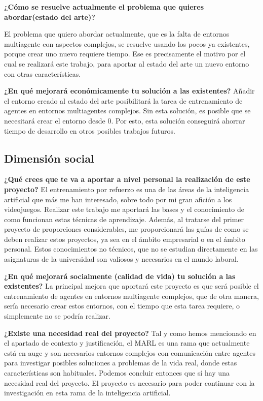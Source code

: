 \textbf{¿Cómo se resuelve actualmente el problema que quieres abordar(estado del arte)?}

El problema que quiero abordar actualmente, que es la falta de entornos multiagente con aspectos complejos, se resuelve usando los pocos ya existentes, porque crear uno nuevo requiere tiempo. Ese es precisamente el motivo por el cual se realizará este trabajo, para aportar al estado del arte un nuevo entorno con otras características.  

\textbf{¿En qué mejorará económicamente tu solución a las existentes?}
Añadir el entorno creado al estado del arte posibilitará la tarea de entrenamiento de agentes en entornos multiagentes complejos. Sin esta solución, es posible que se necesitará crear el entorno desde 0. Por esto, esta solución conseguirá ahorrar tiempo de desarrollo en otros posibles trabajos futuros. 

\subsection{Dimensión social}

\textbf{¿Qué crees que te va a aportar a nivel personal la realización de este proyecto?}
El entrenamiento por refuerzo es una de las áreas de la inteligencia artificial que más me han interesado, sobre todo por mi gran afición a los videojuegos. Realizar este trabajo me aportará las bases y el conocimiento de como funcionan estas técnicas de aprendizaje. Además, al tratarse del primer proyecto de proporciones considerables, me proporcionará las guías de como se deben realizar estos proyectos, ya sea en el ámbito empresarial o en el ámbito personal. Estos conocimientos no técnicos, que no se estudian directamente en las asignaturas de la universidad son valiosos y necesarios en el mundo laboral.  

\textbf{¿En qué mejorará socialmente (calidad de vida) tu solución a las existentes?}
La principal mejora que aportará este proyecto es que será posible el entrenamiento de agentes en entornos multiagente complejos, que de otra manera, sería necesario crear estos entornos, con el tiempo que esta tarea requiere, o simplemente no se podría realizar.  

\textbf{¿Existe una necesidad real del proyecto?}
Tal y como hemos mencionado en el apartado de contexto y justificación, el MARL es una rama que actualmente está en auge y son necesarios entornos complejos con comunicación entre agentes para investigar posibles soluciones a problemas de la vida real, donde estas características son habituales. Podemos concluir entonces que sí hay una necesidad real del proyecto. El proyecto es necesario para poder continuar con la investigación en esta rama de la inteligencia artificial.

